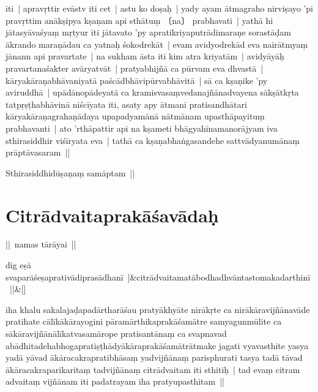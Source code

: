\documentclass[article,a4paper]{memoir}
\begin{document}
	  \pstart iti | apravṛttir evā\-stv iti cet | \label{thakur75-127.29} astu ko doṣaḥ | yady ayam ā\-tmagraho nirviṣayo 'pi pravṛttim anā\-kṣipya kṣaṇam api sthā\-tuṃ 〔na〕 prabhavati | yathā\- hi jā\-tasyā\-vaśyaṃ mṛtyur iti jā\-tavato 'py apratikriyaputrā\-dimaraṇe sorastā\-ḍam ā\-krando maraṇā\-dau ca yatnaḥ śokodrekā\-t | evam avidyodrekā\-d eva nairā\-tmyaṃ jā\-nann api pravartate | na sukham ā\-sta iti kim atra kriyatā\-m | avidyā\-yā\-ḥ pravartanaśakter avā\-ryatvā\-t | \label{thakur75-128.3} pratyabhijñā\- ca pū\-rvam eva dhvastā\- | kā\-ryakā\-raṇabhā\-vaniyatā\- paścā\-dbhā\-vipū\-rvabhā\-vitā\- | sā\- ca kṣaṇike 'py aviruddhā\- | upā\-dā\-nopā\-deyatā\- ca kramisvasaṃvedanajñā\-nadvayena sā\-kṣā\-tkṛta tatpṛṣṭhabhā\-vinā\- niścī\-yata iti, \label{thakur75-128.6} asaty apy ā\-tmani pratisandhā\-tari kā\-ryakā\-raṇagrahaṇā\-daya upapadyamā\-nā\- nā\-tmā\-nam upasthā\-payituṃ prabhavanti | ato 'rthā\-pattir api na kṣameti bhā\-gyahī\-namanorā\-jyam iva sthirasiddhir viśī\-ryata eva | \label{thakur75-121.8} tathā\- ca kṣaṇabhaṅgasandehe sattvā\-dyanumā\-naṃ prā\-ptā\-vasaram ||
	\pend
      

	  \pstart Sthirasiddhidū\-ṣaṇaṃ samā\-ptam || 
	\pend
      
	  
	
\section[{Citrā\-dvaitaprakā\-śavā\-daḥ}]{Citrā\-dvaitaprakā\-śavā\-daḥ}\label{Citrādvaitaprakāśavādaḥ}

	  \pstart || namas tā\-rā\-yai || 
	\pend
      
	    
	    \stanza[\smallbreak]
dig eṣā\- svaparā\-śeṣaprativā\-diprasā\-dhanī\- |&citrā\-dvaitamatā\-bodhadhvā\-ntastomakadarthinī\- ||\&[\smallbreak]


	

	  \pstart iha khalu sakalajaḍapadā\-rtharā\-śau pratyā\-khyā\-te nirā\-kṛte ca nirā\-kā\-ravijñā\-navā\-de pratihate cā\-lī\-kā\-kā\-rayogini pā\-ramā\-rthikaprakā\-śamā\-tre samyagunmū\-lite ca sā\-kā\-ravijñā\-nā\-lī\-katvasamā\-rope pratisantā\-naṃ ca svapnavad abā\-dhitadehabhogapratiṣṭhā\-dyā\-kā\-raprakā\-śamā\-trā\-tmake jagati vyavasthite yasya yadā\- yā\-vad ā\-kā\-racakrapratibhā\-saṃ yadvijñā\-naṃ parisphurati tasya tadā\- tā\-vad ā\-kā\-racakraparikaritaṃ tadvijñā\-naṃ citrā\-dvaitam iti sthitiḥ | tad evaṃ citram advaitaṃ vijñā\-nam iti padatrayam iha pratyupasthitam || 
	\pend
      
\end{document}
